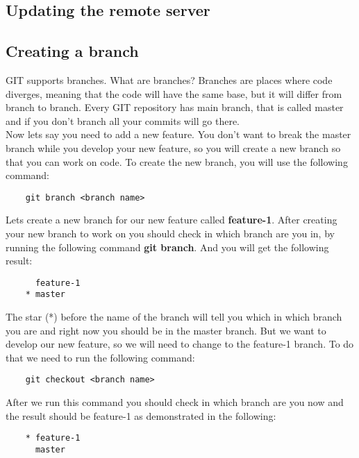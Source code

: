 \documentclass{article}
\begin{document}
\subsection{Updating the remote server}


\subsection{Creating a branch}

GIT supports branches. What are branches? Branches are places where code diverges, meaning that the code will have the same base, but it will differ from branch to branch. Every GIT repository has main branch, that is called master and if you don't branch all your commits will go there.\\

Now lets say you need to add a new feature. You don't want to break the master branch while you develop your new feature, so you will create a new branch so that you can work on code. To create the new branch, you will use the following command:

\begin{lstlisting}
	git branch <branch name>
\end{lstlisting}

Lets create a new branch for our new feature called \textbf{feature-1}. After creating your new branch to work on you should check in which branch are you in, by running the following command \textbf{git branch}. And you will get the following result:

\begin{lstlisting}
	  feature-1
	* master
\end{lstlisting}

The star (*) before the name of the branch will tell you which in which branch you are and right now you should be in the master branch. But we want to develop our new feature, so we will need to change to the feature-1 branch. To do that we need to run the following command:

\begin{lstlisting}
	git checkout <branch name>
\end{lstlisting}

After we run this command you should check in which branch are you now and the result should be feature-1 as demonstrated in the following:

\begin{lstlisting}
	* feature-1
	  master
\end{lstlisting}
\end{document}
